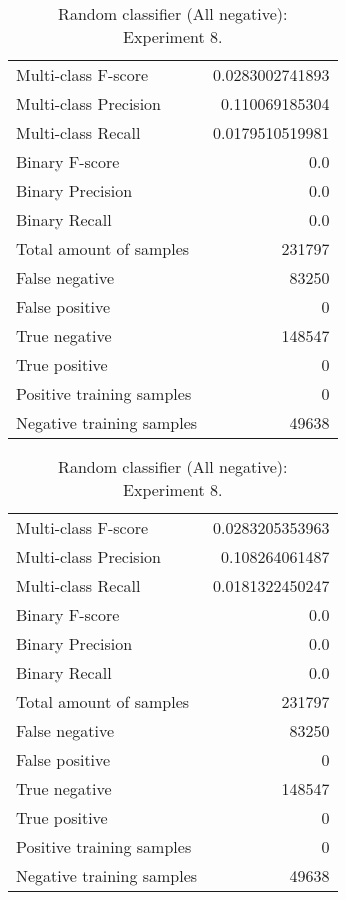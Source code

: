 \begin{table}[H]
\begin{minipage}{0.5\textwidth}
\caption{Random classifier (All negative): \\Experiment 7.}
\centering
\begin{tabular}{l r}
\toprule
Multi-class F-score & 0.0283002741893 \\
Multi-class Precision & 0.110069185304 \\
Multi-class Recall & 0.0179510519981 \\
\midrule
Binary F-score & 0.0 \\
Binary Precision & 0.0 \\
Binary Recall & 0.0 \\
\midrule
Total amount of samples & 231797 \\
False negative & 83250 \\
False positive & 0 \\
True negative & 148547 \\
True positive & 0 \\
\midrule
Positive training samples & 0 \\
Negative training samples & 49638 \\
\bottomrule
\end{tabular}
\end{minipage}
\hfillx
\begin{minipage}{0.5\textwidth}
\caption{Random classifier (All negative): \\Experiment 8.}
\centering
\begin{tabular}{l r}
\toprule
Multi-class F-score & 0.0283205353963 \\
Multi-class Precision & 0.108264061487 \\
Multi-class Recall & 0.0181322450247 \\
\midrule
Binary F-score & 0.0 \\
Binary Precision & 0.0 \\
Binary Recall & 0.0 \\
\midrule
Total amount of samples & 231797 \\
False negative & 83250 \\
False positive & 0 \\
True negative & 148547 \\
True positive & 0 \\
\midrule
Positive training samples & 0 \\
Negative training samples & 49638 \\
\bottomrule
\end{tabular}
\end{minipage}
\end{table}
